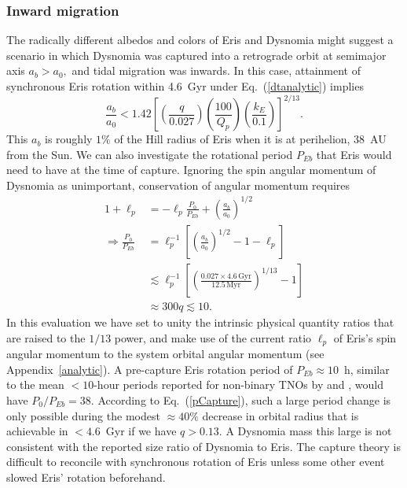 \documentclass[onecolumn]{aastex631}
\begin{document}
\subsubsection{Inward migration}
The radically different albedos and colors of Eris and Dysnomia might suggest a scenario in which Dysnomia was captured into a retrograde orbit at semimajor axis $a_b > a_0,$ and tidal migration was inwards.  In this case,
attainment of synchronous Eris rotation within 4.6~Gyr under Eq.~(\ref{dtanalytic}) implies
\begin{equation}
  \frac{a_b}{a_0} < 1.42 \left[ \left(\frac{q}{0.027}\right) \left(\frac{100}{Q_p}\right) \left(\frac{k_E}{0.1}\right) \right]^{2/13}.
\end{equation}
This $a_b$ is roughly $1\%$ of the Hill radius of Eris when it is at perihelion, 38~AU from the Sun.  We can also investigate the rotational period $P_{Eb}$ that Eris would need to have at the time of capture. Ignoring the spin angular momentum of Dysnomia as unimportant, conservation of angular momentum requires
\begin{align}
  1+\ell_p & = -\ell_p \frac{P_{0}}{P_{Eb}} + \left(\frac{a_b}{a_0}\right)^{1/2} \nonumber \\
  \Rightarrow \frac{P_{0}}{P_{Eb}} & = \ell_p^{-1} \left[ \left(\frac{a_b}{a_0}\right)^{1/2} -1 - \ell_p\right] \nonumber \\
           & \lesssim \ell_p^{-1}\left[\left(\frac {0.027\times 4.6\,\textrm{Gyr}}{12.5\,\textrm{Myr}}
             \right)^{1/13} - 1 \right] \nonumber \\
           & \approx 300 q \lesssim 10.
\label{pCapture}
\end{align}
In this evaluation we have set to unity the intrinsic physical quantity ratios that are raised to the $1/13$ power, and make use of the current ratio $\ell_p$ of Eris's spin angular momentum to the system orbital angular momentum (see Appendix~\ref{analytic}).
A pre-capture Eris rotation period of $P_{Eb}\approx10$~h, similar to the mean $<10$-hour periods reported for non-binary TNOs by \citet{LacLuu06} and \citet{Thirouin14}, would have $P_0/P_{Eb}=38.$  
According to Eq.~(\ref{pCapture}), such a large period change is only possible during
the modest $\approx40\%$ decrease in orbital radius that is achievable in $<4.6$~Gyr if we have $q>0.13.$ A Dysnomia mass this large is not consistent with the reported size ratio of Dysnomia to Eris.  The capture theory is difficult to reconcile with synchronous rotation of Eris unless some other event slowed Eris' rotation beforehand.
\end{document}
